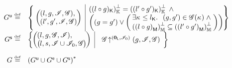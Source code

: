 \begin{definition}[Guarantee]
\[\begin{array}{r l}
	\updateG \eqdef &
 	\left\{
 	\hspace*{-0.1cm}
	 \begin{array}{l | r}
	   \left(
	   \hspace*{-0.2cm}
	   \begin{array}{l}
	     (l, g, \lmod, \gmod),\\
	     (l', g', \lmod, \gmod)\\
	   \end{array}
	   \hspace*{-0.2cm}
 	  \right)
	  &
	  \begin{array}{@{} l @{}}
	  	\capSize{\capPart{(l \composeL g)} } = \capSize{ \capPart{(l' \composeL g')} }\;\land\\
		  \left(
		 	  (g = g')\lor
		 	  \left(
		 	  \hspace*{-0.1cm}
		 	  \begin{array}{l}
		 	  	\exsts{\ca{} \leq \capPart{l}}\;\;
		 	  	(g, g') \in \gmod(\ca{}) \;\land\\
		 	  	
		 	  	\heapSize{\heapPart{\left(l \composeL g \right)}} \subseteq 
		 	  	\heapSize{\heapPart{\left(l' \composeL g'\right)}}
		 	  \end{array}	
		 	  \hspace*{-0.1cm}
		 	  \right)
	   	\right)
   	\end{array}
 	\end{array}
 	\hspace*{-0.2cm}
	\right\}\\
	
	
	
	\shiftG \eqdef & 
	\left\{
 	\hspace*{-0.2cm}
	 \begin{array}{l | r}
	   \left(
	   \hspace*{-0.2cm}
	   \begin{array}{l}
	     (l, g, \gmod{}, \lmod{}),\\
 	     \left(
	     \hspace*{-0.2cm}
	     \begin{array}{l}
	      l,
	      s,
	      \lmod \cup \lmod_{0}, \gmod
	     \end{array}
 	    \hspace*{-0.2cm}
 	    \right)
	   \end{array}
	   \hspace*{-0.2cm}
 	  \right)
	   &
 	  \begin{array}{l}
			\expandsAM{\gmod}{\unitL}{\lmod_{0}}{g}{\lmod}{\gmod}
			
   	\end{array}
 	\end{array}
 	\hspace*{-0.2cm}
	\right\}\\\\
	
	\guarantee \eqdef & \left( \updateG \cup \extendG \cup \shiftG \right)^{*} \\\\
\end{array}
\]
%
\end{definition}

